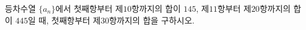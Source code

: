 등차수열 $\{a_n\}$에서 첫째항부터 제$10$항까지의 합이 $145$, 제$11$항부터 제$20$항까지의 합이 $445$일 때, 첫째항부터 제$30$항까지의 합을 구하시오.
